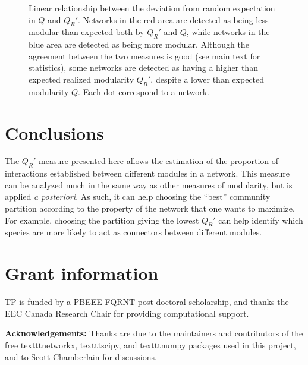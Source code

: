 \documentclass[12pt,oneside]{article}
\begin{document}
\begin{figure}[tbp]
	\begin{center}
	\end{center}
	\caption{Linear relationship between the deviation from random expectation in $Q$ and $Q_R'$. Networks in the red area are detected as being less modular than expected both by $Q_R'$ and $Q$, while networks in the blue area are detected as being more modular. Although the agreement between the two measures is good (see main text for statistics), some networks are detected as having a higher than expected realized modularity $Q_R'$, despite a lower than expected modularity $Q$. Each dot correspond to a network.}
	\label{f:dnull}
\end{figure}

\section{Conclusions}

The $Q_R'$ measure presented here allows the estimation of the proportion of
interactions established between different modules in a network. This measure
can be analyzed much in the same way as other measures of modularity, but is
applied \emph{a posteriori}. As such, it can help choosing the ``best''
community partition according to the property of the network that one wants to
maximize. For example, choosing the partition giving the lowest $Q_R'$ can
help identify which species are more likely to act as connectors between
different modules.

\section{Grant information}

TP is funded by a PBEEE-FQRNT post-doctoral scholarship, and thanks the EEC
Canada Research Chair for providing computational support.

\textbf{Acknowledgements:} Thanks are due to the maintainers and contributors of
the free texttt{networkx}, texttt{scipy}, and texttt{numpy} packages used in
this project, and to Scott Chamberlain for discussions.

\printbibliography
\end{document}
